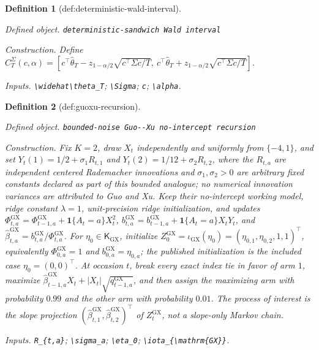 \documentclass{article}
\newtheorem{definition}{Definition}
\begin{document}
\begin{definition}[def:deterministic-wald-interval]\label{def:deterministic-wald-interval}
\par\smallskip\noindent\emph{Defined object.} \texttt{deterministic-\allowbreak{}sandwich Wald interval}
\par\smallskip\noindent\emph{Construction.} Define \(C_T^{\Sigma}(c,\alpha)=[c^\top\widehat\theta_T-z_{1-\alpha/2}\sqrt{c^\top\Sigma c/T},\ c^\top\widehat\theta_T+z_{1-\alpha/2}\sqrt{c^\top\Sigma c/T}]\).
\par\smallskip\noindent\emph{Inputs.} \texttt{\textbackslash{}\allowbreak{}widehat\textbackslash{}\allowbreak{}theta\_\allowbreak{}T}; \texttt{\textbackslash{}\allowbreak{}Sigma}; \texttt{c}; \texttt{\textbackslash{}\allowbreak{}alpha}.
\end{definition}

\begin{definition}[def:guoxu-recursion]\label{def:guoxu-recursion}
\par\smallskip\noindent\emph{Defined object.} \texttt{bounded-\allowbreak{}noise Guo-\allowbreak{}-\allowbreak{}Xu no-\allowbreak{}intercept recursion}
\par\smallskip\noindent\emph{Construction.} Fix \(K=2\), draw \(X_t\) independently and uniformly from \(\{-4,1\}\), and set \(Y_t(1)=1/2+\sigma_1R_{t,1}\) and \(Y_t(2)=1/12+\sigma_2R_{t,2}\), where the \(R_{t,a}\) are independent centered Rademacher innovations and \(\sigma_1,\sigma_2>0\) are arbitrary fixed constants declared as part of this bounded analogue; no numerical innovation variances are attributed to Guo and Xu. Keep their no-intercept working model, ridge constant \(\lambda=1\), unit-precision ridge initialization, and updates \(\Phi^{\mathrm{GX}}_{t,a}=\Phi^{\mathrm{GX}}_{t-1,a}+\mathbf 1\{A_t=a\}X_t^2\), \(b^{\mathrm{GX}}_{t,a}=b^{\mathrm{GX}}_{t-1,a}+\mathbf 1\{A_t=a\}X_tY_t\), and \(\widehat\beta^{\mathrm{GX}}_{t,a}=b^{\mathrm{GX}}_{t,a}/\Phi^{\mathrm{GX}}_{t,a}\). For \(\eta_0\in\mathsf K_{\mathrm{GX}}\), initialize \(Z^{\mathrm{GX}}_0=\iota_{\mathrm{GX}}(\eta_0)=(\eta_{0,1},\eta_{0,2},1,1)^\top\), equivalently \(\Phi^{\mathrm{GX}}_{0,a}=1\) and \(b^{\mathrm{GX}}_{0,a}=\eta_{0,a}\); the published initialization is the included case \(\eta_0=(0,0)^\top\). At occasion \(t\), break every exact index tie in favor of arm \(1\), maximize \(\widehat\beta^{\mathrm{GX}}_{t-1,a}X_t+|X_t|\sqrt{q^{\mathrm{GX}}_{t-1,a}}\), and then assign the maximizing arm with probability \(0.99\) and the other arm with probability \(0.01\). The process of interest is the slope projection \((\widehat\beta^{\mathrm{GX}}_{t,1},\widehat\beta^{\mathrm{GX}}_{t,2})^\top\) of \(Z^{\mathrm{GX}}_t\), not a slope-only Markov chain.
\par\smallskip\noindent\emph{Inputs.} \texttt{R\_\allowbreak{}\{t,\allowbreak{}a\}\allowbreak{}}; \texttt{\textbackslash{}\allowbreak{}sigma\_\allowbreak{}a}; \texttt{\textbackslash{}\allowbreak{}eta\_\allowbreak{}0}; \texttt{\textbackslash{}\allowbreak{}iota\_\allowbreak{}\{\textbackslash{}\allowbreak{}mathrm\{GX\}\allowbreak{}\}\allowbreak{}}.
\end{definition}
\end{document}
